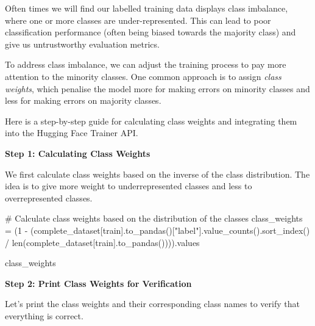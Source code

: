 \documentclass[
  letterpaper,
  DIV=11,
  numbers=noendperiod]{scrreprt}
\newenvironment{Shaded}{\begin{snugshade}}{\end{snugshade}}
\newcommand{\BuiltInTok}[1]{\textcolor[rgb]{0.00,0.23,0.31}{#1}}
\newcommand{\CommentTok}[1]{\textcolor[rgb]{0.37,0.37,0.37}{#1}}
\newcommand{\DecValTok}[1]{\textcolor[rgb]{0.68,0.00,0.00}{#1}}
\newcommand{\NormalTok}[1]{\textcolor[rgb]{0.00,0.23,0.31}{#1}}
\newcommand{\OperatorTok}[1]{\textcolor[rgb]{0.37,0.37,0.37}{#1}}
\newcommand{\StringTok}[1]{\textcolor[rgb]{0.13,0.47,0.30}{#1}}
\begin{document}
\begin{tcolorbox}[enhanced jigsaw, opacitybacktitle=0.6, breakable, title=\textcolor{quarto-callout-tip-color}{\faLightbulb}\hspace{0.5em}{Class Imbalance Issues}, arc=.35mm, colframe=quarto-callout-tip-color-frame, colbacktitle=quarto-callout-tip-color!10!white, left=2mm, bottomrule=.15mm, opacityback=0, toprule=.15mm, bottomtitle=1mm, toptitle=1mm, titlerule=0mm, leftrule=.75mm, colback=white, rightrule=.15mm, coltitle=black]

Often times we will find our labelled training data displays class
imbalance, where one or more classes are under-represented. This can
lead to poor classification performance (often being biased towards the
majority class) and give us untrustworthy evaluation metrics.

To address class imbalance, we can adjust the training process to pay
more attention to the minority classes. One common approach is to assign
\emph{class weights}, which penalise the model more for making errors on
minority classes and less for making errors on majority classes.

Here is a step-by-step guide for calculating class weights and
integrating them into the Hugging Face Trainer API.

\textbf{Step 1: Calculating Class Weights}

We first calculate class weights based on the inverse of the class
distribution. The idea is to give more weight to underrepresented
classes and less to overrepresented classes.

\begin{Shaded}
\begin{Highlighting}[]
\CommentTok{\# Calculate class weights based on the distribution of the classes}
\NormalTok{class\_weights }\OperatorTok{=}\NormalTok{ (}\DecValTok{1} \OperatorTok{{-}}\NormalTok{ (complete\_dataset[}\StringTok{\textquotesingle{}train\textquotesingle{}}\NormalTok{].to\_pandas()[}\StringTok{"label"}\NormalTok{].value\_counts().sort\_index() }\OperatorTok{/} \BuiltInTok{len}\NormalTok{(complete\_dataset[}\StringTok{\textquotesingle{}train\textquotesingle{}}\NormalTok{].to\_pandas()))).values}

\NormalTok{class\_weights}
\end{Highlighting}
\end{Shaded}

\textbf{Step 2: Print Class Weights for Verification}

Let's print the class weights and their corresponding class names to
verify that everything is correct.


\end{tcolorbox}
\end{document}
